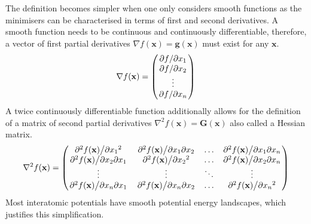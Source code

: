 The definition becomes simpler when one only considers smooth functions as the
minimisers can be characterised in terms of first and second derivatives. A
smooth function needs to be continuous and continuously differentiable,
therefore, a vector of first partial derivatives $\nabla
f(\mathbf{x})=\mathbf{g}(\mathbf{x})$ must exist for any $\mathbf{x}$.
%
\begin{equation}
    \nabla f(\mathbf{x})=
    \begin{pmatrix}
        \pdv*{f}{x_1}\\
        \pdv*{f}{x_2}\\
        \vdots\\
        \pdv*{f}{x_n}
    \end{pmatrix}
\end{equation}
%
A twice continuously differentiable function additionally allows for the
definition of a matrix of second partial derivatives $\nabla^2
f(\mathbf{x})=\mathbf{G}(\mathbf{x})$ also called a Hessian matrix.
%
\begin{equation}
    \nabla^2 f(\mathbf{x})=
    \begin{pmatrix}
        \pdv*[2]{f(\mathbf{x})}{{x_1}} & \pdv*{f(\mathbf{x})}{x_1}{x_2} & \ldots & \pdv*{f(\mathbf{x})}{x_1}{x_{n}}\\
        \pdv*{f(\mathbf{x})}{x_2}{x_1} & \pdv*[2]{f(\mathbf{x})}{{x_2}} & \ldots & \pdv*{f(\mathbf{x})}{x_2}{x_{n}}\\
        \vdots & \vdots & \ddots & \vdots\\
        \pdv*{f(\mathbf{x})}{x_{n}}{x_1} & \pdv*{f(\mathbf{x})}{x_{n}}{x_2} & \ldots & \pdv*[2]{f(\mathbf{x})}{{x_{n}}}
    \end{pmatrix}
\end{equation}
%
Most interatomic potentials have smooth potential energy landscapes, which
justifies this simplification. 

